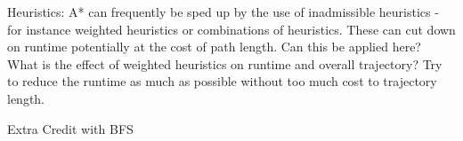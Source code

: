 \documentclass{homeworg}
\begin{document}
\newpage
\exercise*
Heuristics: A* can frequently be sped up by the use of inadmissible heuristics - for
instance weighted heuristics or combinations of heuristics. These can cut down on runtime potentially at the cost of path length. Can this be applied here? What is the effect of weighted heuristics on runtime and overall trajectory? Try to reduce the runtime as much as possible without too much cost to trajectory length.

\newpage
Extra Credit with BFS
\end{document}
